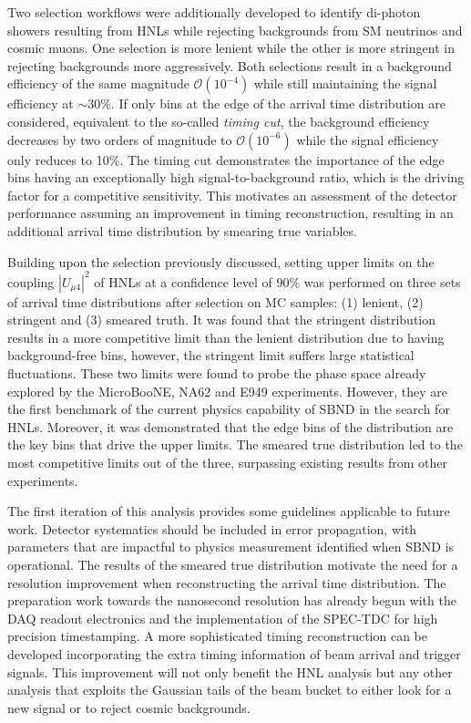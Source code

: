 Two selection workflows were additionally developed to identify di-photon showers resulting from HNLs while rejecting backgrounds from SM neutrinos and cosmic muons.
One selection is more lenient while the other is more stringent in rejecting backgrounds more aggressively.
Both selections result in a background efficiency of the same magnitude $\mathcal{O}(10^{-4})$ while still maintaining the signal efficiency at $\sim$30\%.
If only bins at the edge of the arrival time distribution are considered, equivalent to the so-called \textit{timing cut}, the background efficiency decreases by two orders of magnitude to $\mathcal{O}(10^{-6})$ while the signal efficiency only reduces to 10\%. 
The timing cut demonstrates the importance of the edge bins having an exceptionally high signal-to-background ratio, which is the driving factor for a competitive sensitivity.
This motivates an assessment of the detector performance assuming an improvement in timing reconstruction, resulting in an additional arrival time distribution by smearing true variables.

Building upon the selection previously discussed, setting upper limits on the coupling $|U_{\mu4}|^2$ of HNLs at a confidence level of 90\% was performed on three sets of arrival time distributions after selection on MC samples: (1) lenient, (2) stringent and (3) smeared truth.  
It was found that the stringent distribution results in a more competitive limit than the lenient distribution due to having background-free bins, however, the stringent limit suffers large statistical fluctuations.
These two limits were found to probe the phase space already explored by the MicroBooNE, NA62 and E949 experiments.
However, they are the first benchmark of the current physics capability of SBND in the search for HNLs.
Moreover, it was demonstrated that the edge bins of the distribution are the key bins that drive the upper limits.   
The smeared true distribution led to the most competitive limits out of the three, surpassing existing results from other experiments.  

The first iteration of this analysis provides some guidelines applicable to future work.
Detector systematics should be included in error propagation, with parameters that are impactful to physics measurement identified when SBND is operational.
The results of the smeared true distribution motivate the need for a resolution improvement when reconstructing the arrival time distribution.
The preparation work towards the nanosecond resolution has already begun with the DAQ readout electronics and the implementation of the SPEC-TDC for high precision timestamping.  
A more sophisticated timing reconstruction can be developed incorporating the extra timing information of beam arrival and trigger signals.
This improvement will not only benefit the HNL analysis but any other analysis that exploits the Gaussian tails of the beam bucket to either look for a new signal or to reject cosmic backgrounds.
